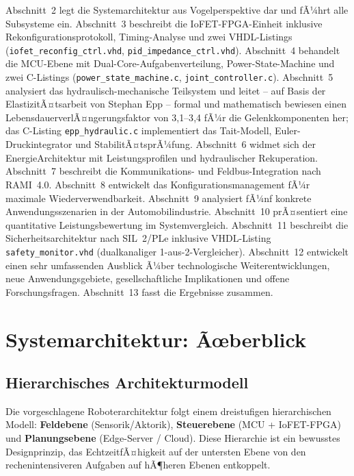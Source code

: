 ﻿\documentclass[a4paper,12pt]{scrreprt}
\theoremstyle{definition}
\begin{document}
Abschnitt~2 legt die Systemarchitektur aus Vogelperspektive dar und
fÃ¼hrt alle Subsysteme ein. Abschnitt~3 beschreibt die IoFET-FPGA-Einheit inklusive
Rekonfigurationsprotokoll, Timing-Analyse und zwei VHDL-Listings
(\texttt{iofet\_reconfig\_ctrl.vhd}, \texttt{pid\_impedance\_ctrl.vhd}).
Abschnitt~4 behandelt die MCU-Ebene mit Dual-Core-Aufga\-benverteilung,
Power-State-Machine und zwei C-Listings (\texttt{power\_state\_machine.c}, 
\texttt{joint\_\newline controller.c}). Abschnitt~5 analysiert das
hyd\-rau\-lisch-me\-cha\-ni\-sche Teilsystem und leitet -- auf Basis der
ElastizitÃ¤tsarbeit von Stephan Epp \cite{hydr2026} -- formal und
mathematisch bewiesen einen LebensdauerverlÃ¤ngerungsfaktor von 3{,}1--3{,}4
fÃ¼r die Gelenkkomponenten her; das C-Listing \texttt{epp\_hydraulic.c}
implementiert das Tait-Modell, Euler-Druckintegrator und StabilitÃ¤tsprÃ¼fung.
Abschnitt~6 widmet sich der
EnergieArchitektur mit Leistungsprofilen und hydraulischer Rekuperation.
Abschnitt~7 beschreibt die Kommunikations- und Feldbus-Integration nach
RAMI~4.0. Abschnitt~8 entwickelt das Konfigurationsmanagement fÃ¼r
maximale Wiederverwendbarkeit. Abschnitt~9 analysiert fÃ¼nf konkrete
Anwendungsszenarien in der Automobilindustrie. Abschnitt~10 prÃ¤sentiert
eine quantitative Leistungsbewertung im Systemvergleich. Abschnitt~11
beschreibt die Sicherheitsarchitektur nach SIL~2/PLe inklusive VHDL-Listing
\texttt{safety\_monitor.vhd} (dualkanaliger 1-aus-2-Vergleicher). Abschnitt~12
entwickelt einen sehr umfassenden Ausblick Ã¼ber technologische
Weiterentwicklungen, neue Anwendungsgebiete, gesellschaftliche Implikationen
und offene Forschungsfragen. Abschnitt~13 fasst die Ergebnisse zusammen.

\section{Systemarchitektur: Ãœberblick}

\subsection{Hierarchisches Architekturmodell}

Die vorgeschlagene Roboterarchitektur folgt einem dreistufigen
hierarchischen Modell: \textbf{Feldebene} (Sensorik/Aktorik),
\textbf{Steuerebene} (MCU + IoFET-FPGA) und \textbf{Planungsebene}
(Edge-Server / Cloud). Diese Hierarchie ist ein bewusstes Designprinzip,
das EchtzeitfÃ¤higkeit auf der untersten Ebene von den
rechenintensiveren Aufgaben auf hÃ¶heren Ebenen entkoppelt.
\end{document}
